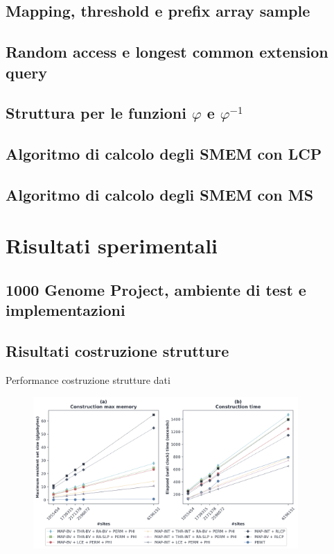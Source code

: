 \documentclass{beamer}
\begin{document}
\subsection{Mapping, threshold e prefix array sample}
\subsection{Random access e longest common extension query}
\subsection{Struttura per le funzioni $\varphi$ e $\varphi^{-1}$}
\subsection{Algoritmo di calcolo degli SMEM con LCP}
\subsection{Algoritmo di calcolo degli SMEM con MS}
\section{Risultati sperimentali}
\subsection{1000 Genome Project, ambiente di test e implementazioni}
\subsection{Risultati costruzione strutture}
\begin{frame}{Performance costruzione strutture dati}
  \begin{figure}[H]
    \centering
    \includegraphics[width=0.9\textwidth]{img/make_time_mem_paper.png}
  \end{figure}
\end{frame}
\end{document}
